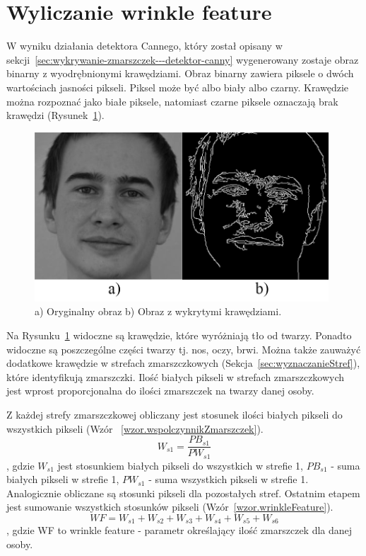 \documentclass[a4paper,twoside,12pt]{book}
\begin{document}
    \section{Wyliczanie wrinkle feature}\label{sec:wyliczanieWrinkleFeature}
    W wyniku działania detektora Cannego, który został opisany w sekcji~\ref{sec:wykrywanie-zmarszczek---detektor-canny}
    wygenerowany zostaje obraz binarny z wyodrębnionymi krawędziami.
    Obraz binarny zawiera piksele o dwóch wartościach jasności pikseli.
    Piksel może być albo biały albo czarny.
    Krawędzie można rozpoznać jako białe piksele, natomiast czarne piksele oznaczają brak krawędzi (Rysunek~\ref{fig.mojaTwarzGray}).

    \begin{figure}
        \centering
        \includegraphics[width=11cm]{Obrazy/mojaTwarzGray.jpg}
        \caption{a) Oryginalny obraz b) Obraz z wykrytymi krawędziami.}
        \label{fig.mojaTwarzGray}
    \end{figure}

    Na Rysunku~\ref{fig.mojaTwarzGray} widoczne są krawędzie, które wyróżniają tło od twarzy.
    Ponadto widoczne są poszczególne części twarzy tj. nos, oczy, brwi.
    Można także zauważyć dodatkowe krawędzie w strefach zmarszczkowych (Sekcja~\ref{sec:wyznaczanieStref}),
    które identyfikują zmarszczki.
    Ilość białych pikseli w strefach zmarszczkowych jest wprost proporcjonalna do ilości zmarszczek na twarzy danej
    osoby.

    Z każdej strefy zmarszczkowej obliczany jest stosunek ilości białych pikseli do wszystkich
    pikseli (Wzór ~\ref{wzor.wspolczynnikZmarszczek}).
    \large
    \begin{equation}
        W_{s1} = \frac{PB_{s1}}{PW_{s1}}
        \label{wzor.wspolczynnikZmarszczek}
    \end{equation}
    \normalsize
    , gdzie $W_{s1}$ jest stosunkiem białych pikseli do wszystkich w strefie 1,
    $PB_{s1}$ - suma białych pikseli w strefie 1, $PW_{s1}$ - suma wszystkich pikseli w strefie 1.
    Analogicznie obliczane są stosunki pikseli dla pozostałych stref.
    Ostatnim etapem jest sumowanie wszystkich stosunków pikseli (Wzór~\ref{wzor.wrinkleFeature}).
    \large
    \begin{equation}
        WF = W_{s1} + W_{s2} + W_{s3} + W_{s4} + W_{s5} + W_{s6}
        \label{wzor.wrinkleFeature}
    \end{equation}
    \normalsize
    , gdzie WF to wrinkle feature - parametr określający ilość zmarszczek dla danej osoby.
\end{document}
